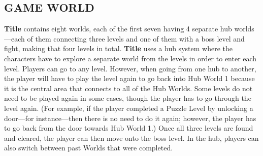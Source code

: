 \documentclass[11pt]{article}
\begin{document}
	\subsection*{GAME WORLD}
	\textbf{Title} contains eight worlds, each of the first seven having 4 separate hub worlds---each of them connecting three levels and one of them with a boss level and fight, making that four levels in total. \textbf{Title} uses a hub system where the characters have to explore a separate world from the levels in order to enter each level. %
	Players can go to any level. However, when going from one hub to another, the player will have to play the level again to go back into Hub World 1 because \iffalse each level is different when going from one hub world to another (e.g., if the player goes to Level 1 from Hub World 1 to Hub World 2, then the level will be different if the player goes from Hub World 2 to Hub World 1);\fi it is the central area that connects to all of the Hub Worlds. Some levels do not need to be played again in some cases, though the player has to go through the level again. (For example, if the player completed a Puzzle Level by unlocking a door---for instance---then there is no need to do it again; however, the player has to go back from the door towards Hub World 1.) \newline \newline
	Once all three levels are found and cleared, the player can then move onto the boss level. In the hub, players can also switch between past Worlds that were completed.
	\begin{center}
	\end{center}
\end{document}
